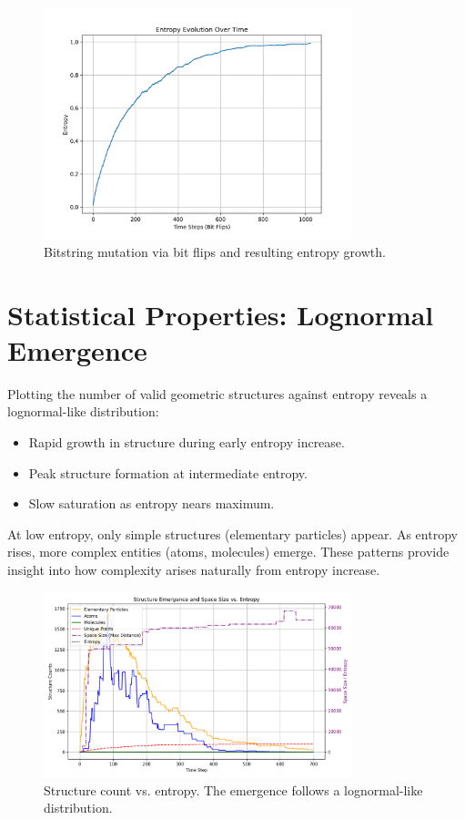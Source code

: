 \documentclass[11pt]{article}
\begin{document}
\begin{figure}[h!]
    \centering
    \includegraphics[width=0.8\textwidth]{figures/entropy_evolution_curve.png}
    \caption{Bitstring mutation via bit flips and resulting entropy growth.}
    \label{fig:bitstring-evolution}
\end{figure}

\section{Statistical Properties: Lognormal Emergence}

Plotting the number of valid geometric structures against entropy reveals a lognormal-like distribution:

\begin{itemize}
    \item Rapid growth in structure during early entropy increase.
    \item Peak structure formation at intermediate entropy.
    \item Slow saturation as entropy nears maximum.
\end{itemize}

At low entropy, only simple structures (elementary particles) appear. As entropy rises, more complex entities (atoms, molecules) emerge. These patterns provide insight into how complexity arises naturally from entropy increase.

\begin{figure}[h!]
    \centering
    \includegraphics[width=0.8\textwidth]{figures/entropy_to_matter.png}
    \caption{Structure count vs. entropy. The emergence follows a lognormal-like distribution.}
    \label{fig:lognormal-structure}
\end{figure}
\end{document}
